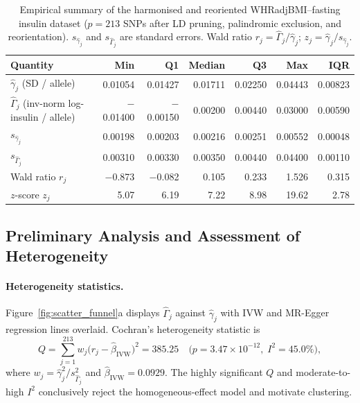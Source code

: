 \documentclass[12pt,a4paper]{article}
\begin{document}
\begin{table}[h!]
\centering
\caption{Empirical summary of the harmonised and reoriented
WHRadjBMI--fasting insulin dataset ($p = 213$ SNPs after LD pruning,
palindromic exclusion, and reorientation).
$s_{\hat\gamma_j}$ and $s_{\hat\Gamma_j}$ are standard errors.
Wald ratio $r_j = \hat\Gamma_j/\hat\gamma_j$;
$z_j = \hat\gamma_j/s_{\hat\gamma_j}$.}
\label{tab:data_summary}
\small
\setlength{\tabcolsep}{5pt}
\begin{tabular}{lrrrrrr}
\toprule
Quantity & Min & Q1 & Median & Q3 & Max & IQR \\
\midrule
$\hat{\gamma}_{j}$ (SD / allele)
  & 0.01054 & 0.01427 & 0.01711 & 0.02250 & 0.04443 & 0.00823 \\
$\hat{\Gamma}_{j}$ (inv-norm log-insulin / allele)
  & $-$0.01400 & $-$0.00150 & 0.00200 & 0.00440 & 0.03000 & 0.00590 \\
$s_{\hat{\gamma}_{j}}$
  & 0.00198 & 0.00203 & 0.00216 & 0.00251 & 0.00552 & 0.00048 \\
$s_{\hat{\Gamma}_{j}}$
  & 0.00310 & 0.00330 & 0.00350 & 0.00440 & 0.04400 & 0.00110 \\
Wald ratio $r_{j}$
  & $-$0.873 & $-$0.082 & 0.105 & 0.233 & 1.526 & 0.315 \\
$z$-score $z_{j}$
  & 5.07 & 6.19 & 7.22 & 8.98 & 19.62 & 2.78 \\
\bottomrule
\end{tabular}
\end{table}

\subsection{Preliminary Analysis and Assessment of Heterogeneity}
\label{sec:whr:prelim}

\paragraph{Heterogeneity statistics.}
Figure~\ref{fig:scatter_funnel}a displays $\hat{\Gamma}_{j}$ against
$\hat{\gamma}_{j}$ with IVW and MR-Egger regression lines overlaid.  Cochran's heterogeneity
statistic is
\begin{equation}
  Q = \sum_{j=1}^{213} w_{j}
      \bigl(r_{j} - \hat{\beta}_{\mathrm{IVW}}\bigr)^{2}
    = 385.25
  \quad \bigl(p = 3.47 \times 10^{-12},\; I^{2} = 45.0\%\bigr),
\end{equation}
where $w_{j} = \hat{\gamma}_{j}^{2}/s^{2}_{\hat{\Gamma}_{j}}$ and
$\hat{\beta}_{\mathrm{IVW}} = 0.0929$.  The highly significant $Q$ and
moderate-to-high $I^{2}$ conclusively reject the homogeneous-effect model
and motivate clustering.
\end{document}
